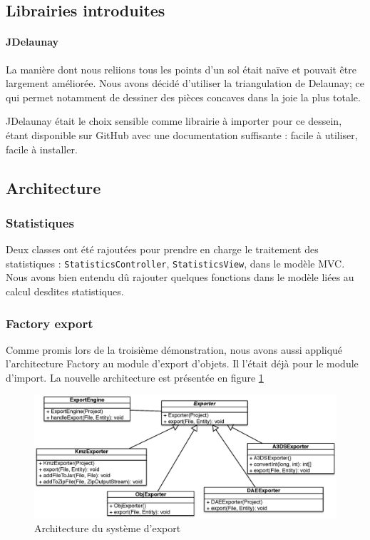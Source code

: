 \subsection{Librairies introduites}

	\paragraph{JDelaunay}
	La manière dont nous reliions tous les points d'un sol était naïve et pouvait
	être largement améliorée. Nous avons décidé d'utiliser la triangulation de 
	Delaunay; ce qui permet notamment de dessiner des pièces concaves dans la 
	joie la plus totale.

	JDelaunay était le choix sensible comme librairie à importer pour ce dessein,
	étant disponible sur GitHub avec une documentation suffisante : facile à 
	utiliser, facile à installer. 

\subsection{Architecture}

	\subsubsection{Statistiques}
	Deux classes ont été rajoutées pour prendre en charge le traitement des
	statistiques : \texttt{StatisticsController}, \texttt{StatisticsView}, dans
	le modèle MVC. Nous avons bien entendu dû rajouter quelques fonctions dans
	le modèle liées au calcul desdites statistiques.

	\subsubsection{Factory export}
	Comme promis lors de la troisième démonstration, nous avons aussi appliqué
	l'architecture Factory au module d'export d'objets. Il l'était déjà pour le
	module d'import. La nouvelle architecture est présentée en figure \ref{fig:archi:exportfactory}
	\begin{figure}
		\center
		\includegraphics[width=\textwidth]{iteration4/fig/exportfactory.eps}
		\caption{\label{fig:archi:exportfactory} Architecture du système d'export}
	\end{figure}

